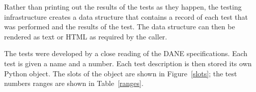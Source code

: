 \documentclass[preprint,3p,11pt]{elsarticle}
\begin{document}
Rather than printing out the results of the tests as they happen, the
testing infrastructure creates a data structure that contains a record
of each test that was performed and the results of the test. The
data structure can then be rendered as text or HTML as required by the
caller. 

The tests were developed by a
close reading of the DANE specifications. Each test is given a name
and a number. Each test description is then stored its own Python
object. The slots of the object are shown in Figure~\ref{slots}; the
test numbers ranges are shown in Table~\ref{ranges}.
\begin{table}
\centering{}
\caption{Slots in the DaneTest object}\label{slots}
\end{table}
\end{document}
